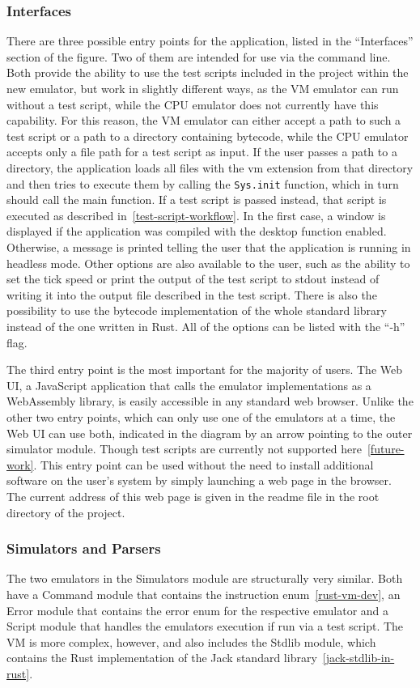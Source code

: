 \subsubsection{Interfaces} \label{interfaces}
There are three possible entry points for the application, listed in the ``Interfaces'' section of the figure.
Two of them are intended for use via the command line.
Both provide the ability to use the test scripts included in the project within the new emulator, but work in slightly different ways, as the VM emulator can run without a test script, while the CPU emulator does not currently have this capability.
For this reason, the VM emulator can either accept a path to such a test script or a path to a directory containing bytecode, while the CPU emulator accepts only a file path for a test script as input.
If the user passes a path to a directory, the application loads all files with the vm extension from that directory and then tries to execute them by calling the \verb+Sys.init+ function, which in turn should call the main function.
If a test script is passed instead, that script is executed as described in~\cref{test-script-workflow}.
In the first case, a window is displayed if the application was compiled with the desktop function enabled.
Otherwise, a message is printed telling the user that the application is running in headless mode.
Other options are also available to the user, such as the ability to set the tick speed or print the output of the test script to stdout instead of writing it into the output file described in the test script.
There is also the possibility to use the bytecode implementation of the whole standard library instead of the one written in Rust.
All of the options can be listed with the ``-h'' flag.

The third entry point is the most important for the majority of users.
The Web UI, a JavaScript application that calls the emulator implementations as a WebAssembly library, is easily accessible in any standard web browser.
Unlike the other two entry points, which can only use one of the emulators at a time, the Web UI can use both, indicated in the diagram by an arrow pointing to the outer simulator module.
Though test scripts are currently not supported here~\ref{future-work}.
This entry point can be used without the need to install additional software on the user's system by simply launching a web page in the browser.
The current address of this web page is given in the readme file in the root directory of the project.

\subsubsection{Simulators and Parsers}
The two emulators in the Simulators module are structurally very similar. Both have a Command module that contains the instruction enum~\ref{rust-vm-dev}, an Error module that contains the error enum for the respective emulator and a Script module that handles the emulators execution if run via a test script.
The VM is more complex, however, and also includes the Stdlib module, which contains the Rust implementation of the Jack standard library~\ref{jack-stdlib-in-rust}.

